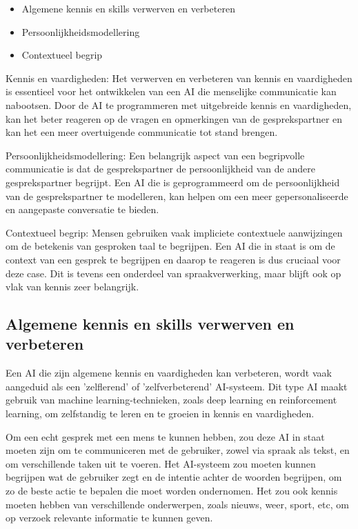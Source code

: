 \begin{itemize}
    \item Algemene kennis en skills verwerven en verbeteren
    \item Persoonlijkheidsmodellering
    \item Contextueel begrip
\end{itemize}

Kennis en vaardigheden: Het verwerven en verbeteren van kennis en vaardigheden is essentieel voor het ontwikkelen van een AI die menselijke communicatie kan nabootsen. Door de AI te programmeren met uitgebreide kennis en vaardigheden, kan het beter reageren op de vragen en opmerkingen van de gesprekspartner en kan het een meer overtuigende communicatie tot stand brengen.

Persoonlijkheidsmodellering: Een belangrijk aspect van een begripvolle communicatie is dat de gesprekspartner de persoonlijkheid van de andere gesprekspartner begrijpt. Een AI die is geprogrammeerd om de persoonlijkheid van de gesprekspartner te modelleren, kan helpen om een meer gepersonaliseerde en aangepaste conversatie te bieden.

Contextueel begrip: Mensen gebruiken vaak impliciete contextuele aanwijzingen om de betekenis van gesproken taal te begrijpen. Een AI die in staat is om de context van een gesprek te begrijpen en daarop te reageren is dus cruciaal voor deze case. Dit is tevens een onderdeel van spraakverwerking, maar blijft ook op vlak van kennis zeer belangrijk.

\newpage

\subsection{Algemene kennis en skills verwerven en verbeteren}

Een AI die zijn algemene kennis en vaardigheden kan verbeteren, wordt vaak aangeduid als een 'zelflerend' of 'zelfverbeterend' AI-systeem. Dit type AI maakt gebruik van machine learning-technieken, zoals deep learning en reinforcement learning, om zelfstandig te leren en te groeien in kennis en vaardigheden.

Om een echt gesprek met een mens te kunnen hebben, zou deze AI in staat moeten zijn om te communiceren met de gebruiker, zowel via spraak als tekst, en om verschillende taken uit te voeren. Het AI-systeem zou moeten kunnen begrijpen wat de gebruiker zegt en de intentie achter de woorden begrijpen, om zo de beste actie te bepalen die moet worden ondernomen. Het zou ook kennis moeten hebben van verschillende onderwerpen, zoals nieuws, weer, sport, etc, om op verzoek relevante informatie te kunnen geven.

